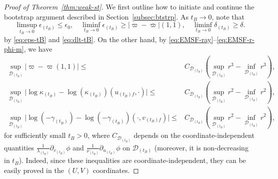 \documentclass[10pt, reqno]{amsart}
\theoremstyle{definition}
\theoremstyle{remark}
\theoremstyle{conjecture}
\numberwithin{equation}{section}
\newcommand{\abs}[1]{\vert#1\vert}
\newcommand{\rd}{\partial}
\newcommand{\0}{\emptyset}
\newcommand{\gmm}{\gamma}
\newcommand{\dlt}{\delta}
\newcommand{\eps}{\epsilon}
\newcommand{\kpp}{\kappa}
\newcommand{\lmb}{\lambda}
\newcommand{\calD}{\mathcal D}
\newcommand{\dur}{\nu}
\newcommand{\dvr}{\lmb}
\newcommand{\varpibg}{\overline{\varpi}}				%
\begin{document}
\begin{proof}[Proof of Theorem~\ref{thm:weak-st}]
We first outline how to initiate and continue the bootstrap argument described in Section~\ref{subsec:btstrp}. As $t_{B} \to 0$, note that 
\begin{equation} \label{eq:weak-st-pf:ini-1}
\limsup_{t_{B} \to 0} \eps_{(t_{B})} \leq \eps_{0}, \quad
\liminf_{t_{B} \to 0} \eps_{(t_{B})} \geq \abs{\varpi - \varpibg}(1,1), \quad
\liminf_{t_{B} \to 0} \dlt_{(t_{B})} \geq \dlt.
\end{equation}
by \eqref{eq:eps-tB} and \eqref{eq:dlt-tB}. On the other hand, by \eqref{eq:EMSF-ray}--\eqref{eq:EMSF-r-phi-m}, we have
\begin{align*}
	\sup_{\calD_{(t_{B})}} \abs{\varpi - \varpi(1,1)} \leq & C_{\calD_{(t_{B})}} \left( \sup_{\calD_{(t_{B})}} r^{3} - \inf_{\calD_{(t_{B})}} r^{3} \right), \\
	\sup_{\calD_{(t_{B})}} \abs{\log \kpp_{(t_{B})} - \log (\kpp_{(t_{B})})(u_{(t_{B}) f}, \cdot)} 
	\leq & C_{\calD_{(t_{B})}} \left( \sup_{\calD_{(t_{B})}} r^{2} - \inf_{\calD_{(t_{B})}} r^{2} \right), \\
	\sup_{\calD_{(t_{B})}} \abs{\log (-\gmm_{(t_{B})}) - \log (-\gmm_{(t_{B})})(\cdot, v_{(t_{B}) f})} 
	\leq & C_{\calD_{(t_{B})}} \left( \sup_{\calD_{(t_{B})}} r^{2} - \inf_{\calD_{(t_{B})}} r^{2} \right),
\end{align*}
for sufficiently small $t_{B} > 0$, where $C_{\calD_{(t_{B})}}$ depends on the coordinate-independent quantities $\frac{1}{\dvr_{(t_{B})}} \rd_{v_{(t_{B})}} \phi$ and $\frac{1}{\dur_{(t_{B})}} \rd_{u_{(t_{B})}} \phi$ on $\calD_{(t_{B})}$ (moreover, it is non-decreasing in $t_{B}$). Indeed, since these inequalities are coordinate-independent, they can be easily proved in the $(U, V)$ coordinates. 


\end{proof}
\end{document}
